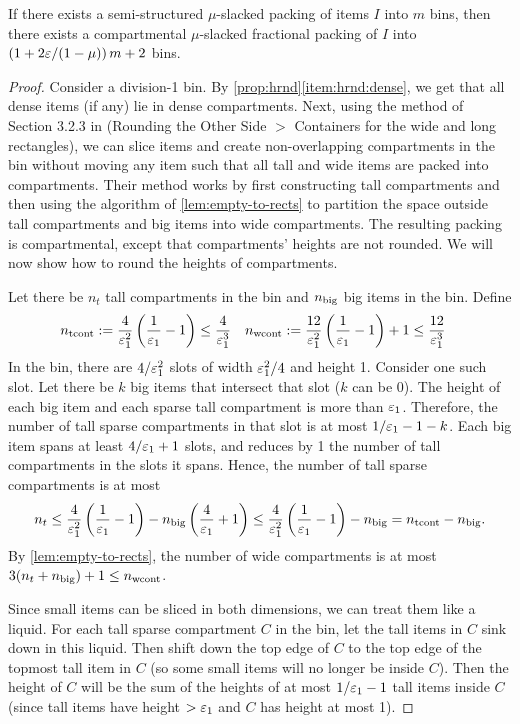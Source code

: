 \begin{lemma}
\label{lem:ss-to-round-cont}
If there exists a semi-structured $\mu$-slacked packing of items $I$ into $m$ bins,
then there exists a compartmental $\mu$-slacked fractional packing of $I$ into
$\left( 1 + 2\varepsilon/(1-\mu) \right) m + 2$ bins.
\end{lemma}
\begin{proof}
Consider a division-1 bin. By \cref{prop:hrnd}\ref{item:hrnd:dense},
we get that all dense items (if any) lie in dense compartments.
Next, using the method of Section 3.2.3 in \cite{pradel-thesis}
(Rounding the Other Side $>$ Containers for the wide and long rectangles),
we can slice items and create non-overlapping compartments
in the bin without moving any item
such that all tall and wide items are packed into compartments.
Their method works by first constructing tall compartments
and then using the algorithm of \cref{lem:empty-to-rects} to partition
the space outside tall compartments and big items into wide compartments.
The resulting packing is compartmental, except that compartments' heights are not rounded.
We will now show how to round the heights of compartments.

Let there be $n_t$ tall compartments in the bin and $n_{\mathrm{big}}$ big items in the bin. Define
\begin{align*}
n_{\mathrm{tcont}} &:= \frac{4}{\varepsilon_1^2}\left(\frac{1}{\varepsilon_1}-1\right)
    \le \frac{4}{\varepsilon_1^3}
&n_{\mathrm{wcont}} &:= \frac{12}{\varepsilon_1^2}\left(\frac{1}{\varepsilon_1} - 1\right) + 1
    \le \frac{12}{\varepsilon_1^3}
\end{align*}
In the bin, there are $4/\varepsilon_1^2$ slots of width $\varepsilon_1^2/4$ and height 1.
Consider one such slot. Let there be $k$ big items that intersect that slot ($k$ can be 0).
The height of each big item and each sparse tall compartment is more than $\varepsilon_1$.
Therefore, the number of tall sparse compartments in that slot is at most $1/\varepsilon_1 - 1 - k$.
Each big item spans at least $4/\varepsilon_1+1$ slots,
and reduces by 1 the number of tall compartments in the slots it spans.
Hence, the number of tall sparse compartments is at most
\[ n_t \le \frac{4}{\varepsilon_1^2}\left(\frac{1}{\varepsilon_1}-1\right)
    - n_{\mathrm{big}}\left(\frac{4}{\varepsilon_1} + 1\right)
\le \frac{4}{\varepsilon_1^2}\left(\frac{1}{\varepsilon_1}-1\right) - n_{\mathrm{big}}
= n_{\mathrm{tcont}} - n_{\mathrm{big}}. \]
By \cref{lem:empty-to-rects}, the number of wide compartments is at most
$3(n_t + n_{\mathrm{big}}) + 1 \le n_{\mathrm{wcont}}$.

Since small items can be sliced in both dimensions, we can treat them like a liquid.
For each tall sparse compartment $C$ in the bin,
let the tall items in $C$ sink down in this liquid.
Then shift down the top edge of $C$ to the top edge of the
topmost tall item in $C$ (so some small items will no longer be inside $C$).
Then the height of $C$ will be the sum of the heights of at most $1/\varepsilon_1-1$
tall items inside $C$ (since tall items have height $> \varepsilon_1$ and $C$ has height at most 1).


\end{proof}
